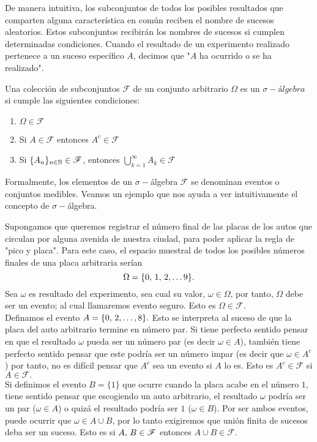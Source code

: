 De manera intuitiva, los subconjuntos de todos los posibles resultados que comparten alguna característica en común reciben el nombre de sucesos aleatorios.
Estos subconjuntos recibirán los nombres de sucesos si cumplen determinadas condiciones. Cuando el resultado de un experimento realizado pertenece a un suceso específico $A$, decimos que "$A$ ha ocurrido o se ha realizado".
\begin{Def}
    Una colección de subconjuntos $\mathscr{F}$  de un conjunto arbitrario $\Omega$ es un $\sigma- \textit{álgebra}$ si cumple las siguientes condiciones:
    \begin{enumerate}
        \item $\Omega\in\mathscr{F}$
        \item Si $A\in\mathscr{F}$ entonces $A^c\in\mathscr{F}$
        \item Si $\{A_n\}_{n\in{\mathbb{N}}}\in\mathscr{F}$, entonces  $\bigcup_{k=1}^\infty A_k\in\mathscr{F}$
    \end{enumerate}
\end{Def}
 Formalmente, los elementos de un $\sigma-$álgebra $\mathscr{F}$ se denominan eventos o conjuntos medibles.
 Veamos un ejemplo que nos ayuda a ver intuitivamente el concepto de $\sigma-$álgebra.
\begin{Ejm}
    Supongamos que queremos registrar el número final de las placas de los autos que circulan por alguna avenida de nuestra ciudad, para poder aplicar la regla de "pico y placa". Para este caso, el espacio muestral de todos los posibles números finales de una placa arbitraria serían 
    $$\Omega=\{0,\thinspace 1,\thinspace 2,\ldots 9\}.$$
    Sea $\omega$ es resultado del experimento, sea cual su valor, $\omega \in\Omega$, por tanto, $\Omega$ debe ser un evento; al cual llamaremos evento seguro. Esto es $\Omega\in\mathscr{F}.$\\ Definamos el evento $A=\{0,\thinspace 2,\ldots ,8\}.$ Esto se interpreta al suceso de que la placa del auto arbitrario termine en número par. Si tiene perfecto sentido pensar en que el resultado $\omega$ pueda ser un número par (es decir $\omega\in A$), también tiene perfecto sentido pensar que este podría ser un número impar (es decir que $\omega \in A^c$) por tanto, no es difícil pensar que $A^c$ sea un evento si $A$ lo es. Esto es $A^c\in\mathscr{F}$ si $A\in\mathscr{F}.$\\Si definimos el evento $B=\{1\}$ que ocurre cuando la placa acabe en el número $1$, tiene sentido pensar que escogiendo un auto arbitrario, el resultado $\omega$ podría ser un par ($\omega\in A$) o quizá el resultado podría ser $1$ ($\omega\in B$). Por ser ambos eventos, puede ocurrir que $\omega\in A\cup B$, por lo tanto exigiremos que  unión finita de sucesos deba ser un suceso. Esto es si $A,\thinspace B\in\mathscr{F}$ entonces $A\cup B\in \mathscr{F}.$
\end{Ejm}
